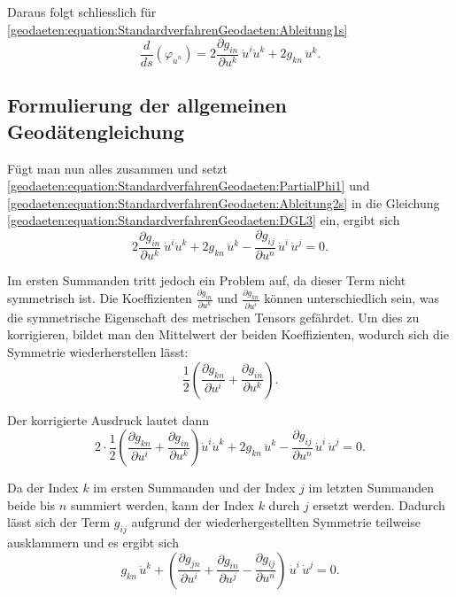 Daraus folgt schliesslich für \eqref{geodaeten:equation:StandardverfahrenGeodaeten:Ableitung1s}
\begin{equation}
	\frac{d}{ds} \left( \varphi_{\dot{u}^n} \right) = 2 \frac{\partial g_{in}}{\partial u^k} \ \dot{u}^i \dot{u}^k + 2 g_{kn} \, \ddot{u}^k.
	\label{geodaeten:equation:StandardverfahrenGeodaeten:Ableitung2s}
\end{equation}

\subsection{Formulierung der allgemeinen Geodätengleichung}
Fügt man nun alles zusammen und setzt \eqref{geodaeten:equation:StandardverfahrenGeodaeten:PartialPhi1} und \eqref{geodaeten:equation:StandardverfahrenGeodaeten:Ableitung2s} in die Gleichung \eqref{geodaeten:equation:StandardverfahrenGeodaeten:DGL3} ein, ergibt sich
\begin{equation}
	2 \frac{\partial g_{in}}{\partial u^k} \ \dot{u}^i \dot{u}^k + 2 g_{kn} \, \ddot{u}^k - \frac{\partial g_{ij}}{\partial u^n} \, \dot{u}^i \, \dot{u}^j = 0.
\end{equation}

Im ersten Summanden tritt jedoch ein Problem auf, da dieser Term nicht symmetrisch ist. 
Die Koeffizienten $\frac{\partial g_{in}}{\partial u^k}$ und $\frac{\partial g_{kn}}{\partial u^i}$ können unterschiedlich sein, was die symmetrische Eigenschaft des metrischen Tensors gefährdet. 
Um dies zu korrigieren, bildet man den Mittelwert der beiden Koeffizienten, wodurch sich die Symmetrie wiederherstellen lässt:
\begin{equation}
	\frac{1}{2} \left( \frac{\partial g_{kn}}{\partial u^i} + \frac{\partial g_{in}}{\partial u^k} \right).
\end{equation}

Der korrigierte Ausdruck lautet dann
\begin{equation}
	2 \cdot \frac{1}{2} \left( \frac{\partial g_{kn}}{\partial u^i} + \frac{\partial g_{in}}{\partial u^k} \right) \dot{u}^i \dot{u}^k + 2 g_{kn} \, \ddot{u}^k - \frac{\partial g_{ij}}{\partial u^n} \, \dot{u}^i \, \dot{u}^j = 0.
\end{equation}

Da der Index $k$ im ersten Summanden und der Index $j$ im letzten Summanden beide bis $n$ summiert werden, kann der Index $k$ durch $j$ ersetzt werden. 
Dadurch lässt sich der Term $g_{ij}$ aufgrund der wiederhergestellten Symmetrie teilweise ausklammern und es ergibt sich
\begin{equation}
	 g_{kn} \, \ddot{u}^k + \left( \frac{\partial g_{jn}}{\partial u^i} + \frac{\partial g_{in}}{\partial u^j} - \frac{\partial g_{ij}}{\partial u^n} \right) \, \dot{u}^i \, \dot{u}^j = 0.
\end{equation}

